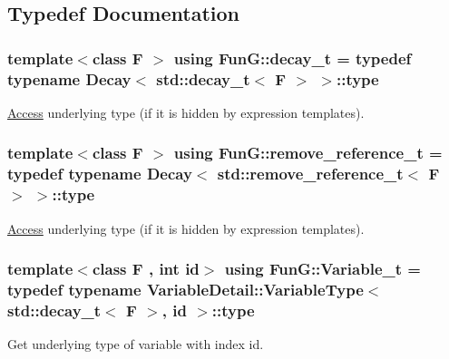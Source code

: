 \subsection{Typedef Documentation}
\hypertarget{namespaceFunG_a7ff91644f18a190ac3d4fc9e970ebe2e}{
\subsubsection[{decay\-\_\-t}]{\setlength{\rightskip}{0pt plus 5cm}template$<$class F $>$ using {\bf Fun\-G\-::decay\-\_\-t} = typedef typename {\bf Decay}$<$ std\-::decay\-\_\-t$<$ F $>$ $>$\-::type}}\label{namespaceFunG_a7ff91644f18a190ac3d4fc9e970ebe2e}


\hyperlink{namespaceFunG_1_1Access}{Access} underlying type (if it is hidden by expression templates). 

\hypertarget{namespaceFunG_a40f6d0896c1e3837d442d39418a4f609}{
\subsubsection[{remove\-\_\-reference\-\_\-t}]{\setlength{\rightskip}{0pt plus 5cm}template$<$class F $>$ using {\bf Fun\-G\-::remove\-\_\-reference\-\_\-t} = typedef typename {\bf Decay}$<$ std\-::remove\-\_\-reference\-\_\-t$<$ F $>$ $>$\-::type}}\label{namespaceFunG_a40f6d0896c1e3837d442d39418a4f609}


\hyperlink{namespaceFunG_1_1Access}{Access} underlying type (if it is hidden by expression templates). 

\hypertarget{namespaceFunG_a1c6fc5c4c7cd6678b9de8962c14b86b5}{
\subsubsection[{Variable\-\_\-t}]{\setlength{\rightskip}{0pt plus 5cm}template$<$class F , int id$>$ using {\bf Fun\-G\-::\-Variable\-\_\-t} = typedef typename Variable\-Detail\-::\-Variable\-Type$<$ std\-::decay\-\_\-t$<$ F $>$, id $>$\-::type}}\label{namespaceFunG_a1c6fc5c4c7cd6678b9de8962c14b86b5}


Get underlying type of variable with index id. 

